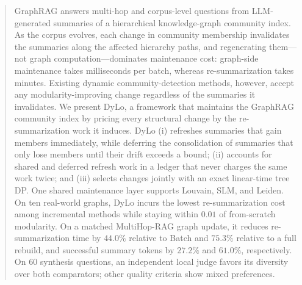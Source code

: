 \begin{abstract}

GraphRAG answers multi-hop and corpus-level questions from LLM-generated summaries of a hierarchical knowledge-graph community index. As the corpus evolves, each change in community membership invalidates the summaries along the affected hierarchy paths, and regenerating them---not graph computation---dominates maintenance cost: graph-side maintenance takes milliseconds per batch, whereas re-summarization takes minutes. Existing dynamic community-detection methods, however, accept any modularity-improving change regardless of the summaries it invalidates. We present DyLo, a framework that maintains the GraphRAG community index by pricing every structural change by the re-summarization work it induces. DyLo (i) refreshes summaries that gain members immediately, while deferring the consolidation of summaries that only lose members until their drift exceeds a bound; (ii) accounts for shared and deferred refresh work in a ledger that never charges the same work twice; and (iii) selects changes jointly with an exact linear-time tree DP. One shared maintenance layer supports Louvain, SLM, and Leiden. On ten real-world graphs, DyLo incurs the lowest re-summarization cost among incremental methods while staying within $0.01$ of from-scratch modularity. On a matched MultiHop-RAG graph update, it reduces re-summarization time by $44.0\%$ relative to Batch and $75.3\%$ relative to a full rebuild, and successful summary tokens by $27.2\%$ and $61.0\%$, respectively. On $60$ synthesis questions, an independent local judge favors its diversity over both comparators; other quality criteria show mixed preferences.

\end{abstract}

